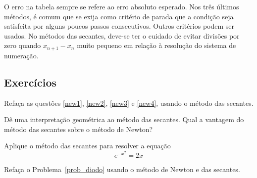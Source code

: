 \begin{obs}
O erro na tabela sempre se refere ao erro absoluto esperado. Nos três últimos métodos, é comum que se exija como critério de parada que a condição seja satisfeita por alguns poucos passos consecutivos. Outros critérios podem ser usados. No métodos das secantes, deve-se ter o cuidado de evitar divisões por zero quando $x_{n+1}-x_n$ muito pequeno em relação à resolução do sistema de numeração.  
\end{obs}

\subsection*{Exercícios}

\begin{exer} Refaça as questões \ref{new1}, \ref{new2}, \ref{new3}  e \ref{new4}, usando o método das secantes.
\end{exer}

\begin{exer} Dê uma interpretação geométrica ao método das secantes. Qual a vantagem do método das secantes sobre o método de Newton?
\end{exer}

\begin{exer} Aplique o método das secantes para resolver a equação
  \begin{equation*}
    e^{-x^2}=2x  
  \end{equation*}
\end{exer}

\begin{exer} Refaça o Problema~\ref{prob_diodo} usando o método de Newton e das secantes.
\end{exer}

